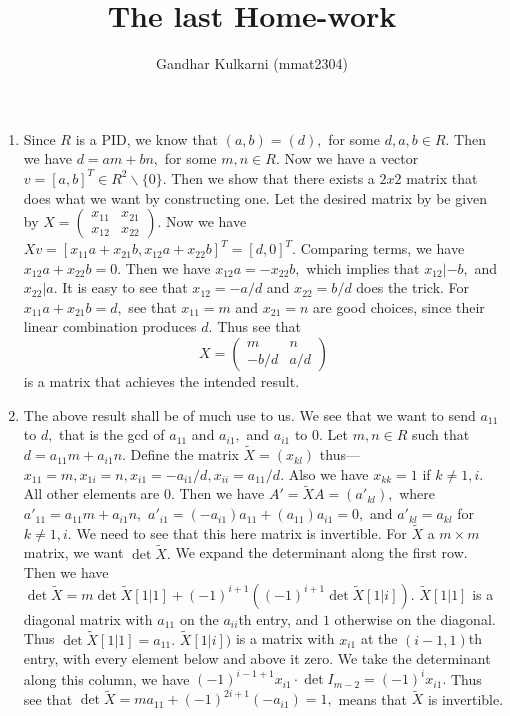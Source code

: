 \documentclass{article}
\title{The last Home-work} %
\author{Gandhar Kulkarni (mmat2304)} %
\date{} %
\begin{document}
\maketitle %


\section{} %
\begin{enumerate}
	\item Since $R$ is a PID, we know that $(a,b)=(d),$ for some $d,a,b \in R.$ Then we have $d=am+bn,$ for some $m,n \in R.$ Now we have a vector 
	$v=[a,b]^T \in R^2 \backslash \{0\}.$ Then we show that there exists a $2x2$ matrix that does what we want by constructing one. Let the desired matrix 
	by be given by $X= \begin{pmatrix}
		x_{11}&x_{21}\\
		x_{12}&x_{22} 	
	\end{pmatrix}.$ Now we have $Xv= [x_{11}a + x_{21}b, x_{12}a+x_{22}b]^T=[d,0]^T.$ Comparing terms, we have $x_{12}a+x_{22}b=0.$ Then we have 
	$x_{12}a=-x_{22}b,$ which implies that $ x_{12}| -b,$ and $x_{22}|a.$ It is easy to see that $x_{12}=-a/d$ and $x_{22}=b/d$ does the trick. For $x_{11}a 
	+ 
	x_{21}b=d,$ see that $x_{11}=m$ and $x_{21}=n$ are good choices, since their linear combination produces $d.$ Thus see that 
		$$X=\begin{pmatrix}
			m&n\\
			-b/d&a/d
		\end{pmatrix} $$ is a matrix that achieves the intended result.
	
	\item The above result shall be of much use to us. We see that we want to send $a_{11}$ to $d,$ that is the gcd of $a_{11}$ and $a_{i1},$ and $a_{i1}$ 
	to $0.$ Let $m,n \in R$ such that $d=a_{11}m+a_{i1}n.$ Define the matrix $\tilde{X}=(x_{kl})$ thus--- $x_{11}=m, x_{1i}=n, x_{i1}=-a_{i1}/d, 
	x_{ii}=a_{11}/d.$ Also we have $x_{kk}=1$ if $k \neq 1,i.$ All other elements are $0.$ Then we have $A'=\tilde{X}A=(a'_{kl}),$ where 
	$a'_{11}=a_{11}m+a_{i1}n,$ $a'_{i1}=(-a_{i1})a_{11}+(a_{11})a_{i1}=0,$ and $a'_{kl}=a_{kl}$ for $k \neq 1,i.$   
	We need to see that this here matrix is invertible. For $\tilde{X}$ a $m \times m$ matrix, we want $\det \tilde{X}.$ We expand the determinant along the 
	first row. Then we have $\det \tilde{X}= m \det \tilde{X}[1|1]+ (-1)^{i+1}((-1)^{i+1}\det \tilde{X}[1|i]).$ $\tilde{X}[1|1]$ is a diagonal matrix with 
	$a_{11}$ on the $a_{ii}$th entry, and $1$ otherwise on the diagonal. Thus $\det \tilde{X}[1|1]=a_{11}.$ $\tilde{X}[1|i])$ is a matrix with $x_{i1}$ at 
	the $(i-1,1)$th entry, with every element below and above it zero. We take the determinant along this column, we have $(-1)^{i-1+1}x_{i1}\cdot \det 
	I_{m-2}=(-1)^{i}x_{i1}.$ Thus see that $\det \tilde{X}=ma_{11}+(-1)^{2i+1}(-a_{i1})=1,$ means that $\tilde{X}$ is invertible. 
	

\end{enumerate}
\end{document}
